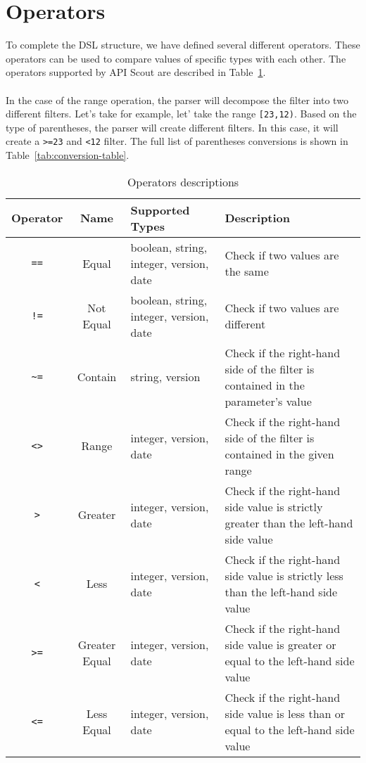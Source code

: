 \section{Operators}\label{sec:operators}
To complete the DSL structure, we have defined several different operators.
These operators can be used to compare values of specific types with each other.
The operators supported by API Scout are described in Table~\ref{tab:operators}. \\ \\
In the case of the range operation, the parser will decompose the filter into two different filters.
Let's take for example, let' take the range \verb|[23,12)|.
Based on the type of parentheses, the parser will create different filters.
In this case, it will create a \verb|>=23| and \verb|<12| filter.
The full list of parentheses conversions is shown in Table~\ref{tab:conversion-table}.

\begin{table}[!h]
    \begin{center}
        \begin{tabular}{c c p{2.5cm} p{9cm}}
            \hline
            \textbf{Operator} & \textbf{Name} & \textbf{Supported Types} & \textbf{Description} \\ \hline
            \verb|==| & Equal & boolean, string, integer, version, date & Check if two values are the same \\
            \verb|!=| & Not Equal & boolean, string, integer, version, date & Check if two values are different \\
            \verb|~=| & Contain & string, version & Check if the right-hand side of the filter is contained in the parameter's value \\
            \verb|<>| & Range & integer, version, date & Check if the right-hand side of the filter is contained in the given range \\
            \verb|>| & Greater & integer, version, date & Check if the right-hand side value is strictly greater than the left-hand side value \\
            \verb|<| & Less & integer, version, date & Check if the right-hand side value is strictly less than the left-hand side value \\
            \verb|>=| & Greater Equal & integer, version, date & Check if the right-hand side value is greater or equal to the left-hand side value \\
            \verb|<=| & Less Equal & integer, version, date & Check if the right-hand side value is less than or equal to the left-hand side value \\ \hline
        \end{tabular}
    \end{center}

    \caption{Operators descriptions}
    \label{tab:operators}
\end{table}

